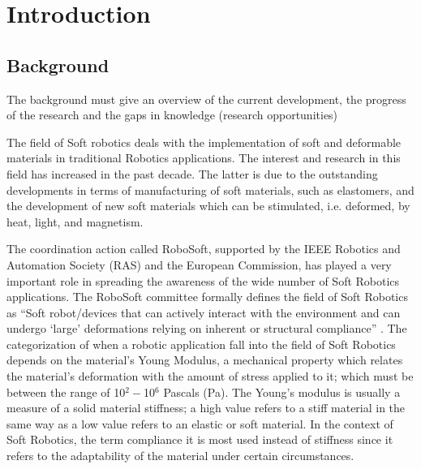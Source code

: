 \chapter{Introduction}
\section{ Background}

\Large{The background must give an overview of the current development, the progress of the research and the gaps in knowledge (research opportunities) }

The field of Soft robotics deals with the implementation of soft and deformable materials in traditional Robotics applications. The interest and research in this field has increased in the past decade. The latter is due to the outstanding developments in terms of manufacturing of soft materials, such as elastomers, and the development of new soft materials which can be stimulated, i.e. deformed, by heat, light, and magnetism. 

The coordination action called RoboSoft, supported by the IEEE Robotics and Automation Society (RAS) and the European Commission, has played a very important role in spreading the awareness of the wide number of Soft Robotics applications. The RoboSoft committee formally defines the field of Soft Robotics as ``Soft robot/devices that can actively interact with the environment and can undergo `large' deformations relying on inherent or structural compliance'' \cite{laschi2016soft}. The categorization of when a robotic application fall into the field of Soft Robotics depends on the material's Young Modulus, a mechanical property which relates the material's deformation with the amount of stress applied to it; which must be between the range of 10$^{2} - $10$^{6}$ Pascals (Pa). The Young's modulus is usually a measure of a solid material stiffness; a high value refers to a stiff material in the same way as a low value refers to an elastic or soft material. In the context of Soft Robotics, the term compliance it is most used instead of stiffness since it refers to the adaptability of the material under certain circumstances.

